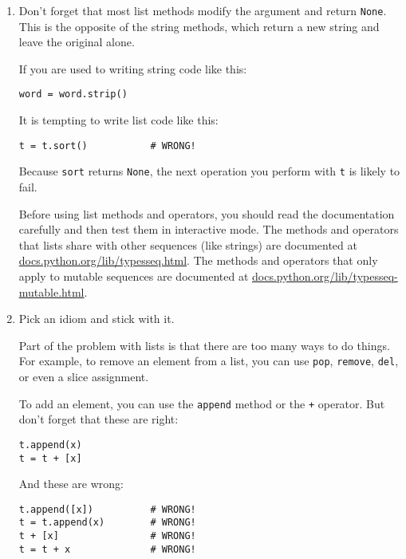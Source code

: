 \begin{enumerate}

\item Don't forget that most list methods modify the argument and
  return {\tt None}.  This is the opposite of the string methods,
  which return a new string and leave the original alone.

If you are used to writing string code like this:

\beforeverb
\begin{verbatim}
word = word.strip()
\end{verbatim}
\afterverb

It is tempting to write list code like this:

\beforeverb
\begin{verbatim}
t = t.sort()           # WRONG!
\end{verbatim}
\afterverb


Because {\tt sort} returns {\tt None}, the
next operation you perform with {\tt t} is likely to fail.

Before using list methods and operators, you should read the
documentation carefully and then test them in interactive mode.  The
methods and operators that lists share with other sequences (like
strings) are documented at
\url{docs.python.org/lib/typesseq.html}.  The
methods and operators that only apply to mutable sequences
are documented at \url{docs.python.org/lib/typesseq-mutable.html}.


\item Pick an idiom and stick with it.

Part of the problem with lists is that there are too many
ways to do things.  For example, to remove an element from
a list, you can use {\tt pop}, {\tt remove}, {\tt del},
or even a slice assignment.

To add an element, you can use the {\tt append} method or
the {\tt +} operator.  But don't forget that these are right: 

\beforeverb
\begin{verbatim}
t.append(x)
t = t + [x]
\end{verbatim}
\afterverb

And these are wrong:

\beforeverb
\begin{verbatim}
t.append([x])          # WRONG!
t = t.append(x)        # WRONG!
t + [x]                # WRONG!
t = t + x              # WRONG!
\end{verbatim}
\afterverb


\end{enumerate}
